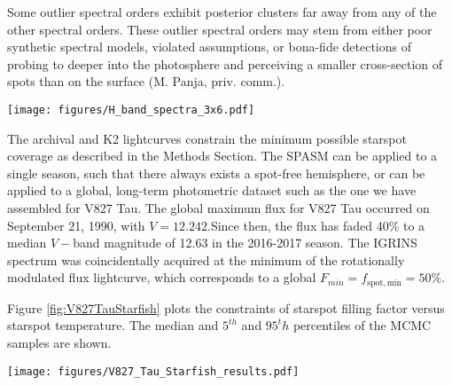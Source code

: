 \documentclass[revtex4]{emulateapj}%
\begin{document}
Some outlier spectral orders exhibit posterior clusters far away from any of the other spectral orders.  These outlier spectral orders may stem from either poor synthetic spectral models, violated assumptions, or bona-fide detections of probing to deeper into the photosphere and perceiving a smaller cross-section of spots than on the surface (M. Panja, priv. comm.).

\begin{figure*}
\centering
\texttt{[image: figures/H\_band\_spectra\_3x6.pdf]}
\caption{Observed IGRINS spectra (thick stepped gray line) for 15 spectral orders $m$,  overplotted with a composite spectrum (thin purple line) composed from Starfish-derived stellar posterior parameters; the shown parameters possess the median filling factor of the burned-in MCMC samples.  The faint dotted blue line shows the hot $T_h$ photospheric component of the spectral decomposition, while the thick red line shows the cool $T_c$ component.  The sum of the red and blue lines is the purple line.  \label{fig:IGRINS-spectra}}
\end{figure*}

The archival and K2 lightcurves constrain the minimum possible starspot coverage as described in the Methods Section.  The SPASM can be applied to a single season, such that there always exists a spot-free hemisphere, or can be applied to a global, long-term photometric dataset such as the one we have assembled for V827 Tau.  The global maximum flux for V827 Tau occurred on September 21, 1990, with $V=12.242$.Since then, the flux has faded 40\% to a median $V-$band magnitude of 12.63 in the 2016-2017 season.  The IGRINS spectrum was coincidentally acquired at the minimum of the rotationally modulated flux lightcurve, which corresponds to a global $F_{min} = f_{\mathrm{spot, min}} = 50\%$.

Figure \ref{fig:V827TauStarfish} plots the constraints of starspot filling factor versus starspot temperature.  The median and $5^{th}$ and $95^th$ percentiles of the MCMC samples are shown.

\begin{figure*}
\centering
  \texttt{[image: figures/V827\_Tau\_Starfish\_results.pdf]}
  \caption{Results of Starfish-based inference of starspot filling factor and temperature for 22 IGRINS $H-$band orders.  The size of the points is proportional to the strength of the posterior constraint on $f_{\rm spot}$ for each order.}
\label{fig:V827TauStarfish}
\end{figure*}
\end{document}
